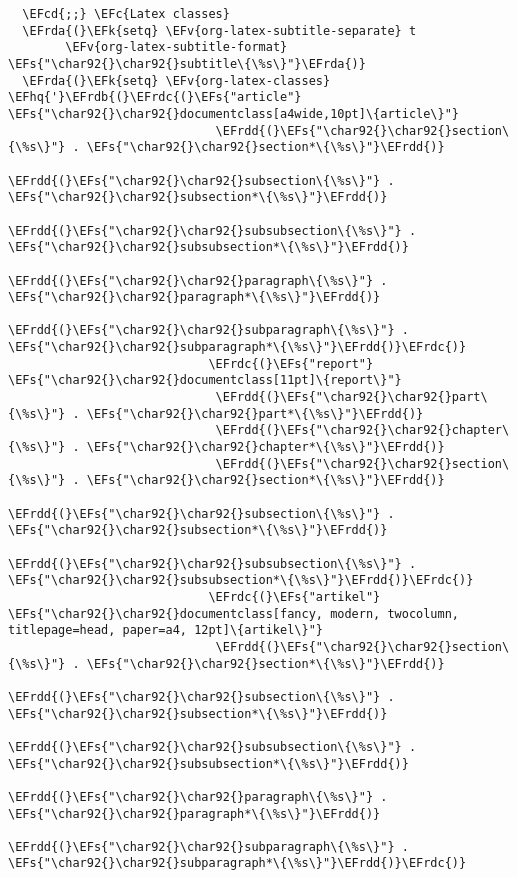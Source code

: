 \documentclass[a4wide,10pt]{article}
\newcommand{\EFc}[1]{\textcolor{EFc}{#1}} %
\newcommand{\EFcd}[1]{\textcolor{EFcd}{#1}} %
\newcommand{\EFs}[1]{\textcolor{EFs}{#1}} %
\newcommand{\EFk}[1]{\textcolor{EFk}{#1}} %
\newcommand{\EFv}[1]{\textcolor{EFv}{#1}} %
\newcommand{\EFhq}[1]{\textcolor{EFhq}{#1}} %
\newcommand{\EFrda}[1]{\textcolor{EFrda}{#1}} %
\newcommand{\EFrdb}[1]{\textcolor{EFrdb}{#1}} %
\newcommand{\EFrdc}[1]{\textcolor{EFrdc}{#1}} %
\newcommand{\EFrdd}[1]{\textcolor{EFrdd}{#1}} %
\begin{document}
\begin{Code}
\begin{Verbatim}
  \EFcd{;;} \EFc{Latex classes}
  \EFrda{(}\EFk{setq} \EFv{org-latex-subtitle-separate} t
        \EFv{org-latex-subtitle-format} \EFs{"\char92{}\char92{}subtitle\{\%s\}"}\EFrda{)}
  \EFrda{(}\EFk{setq} \EFv{org-latex-classes} \EFhq{'}\EFrdb{(}\EFrdc{(}\EFs{"article"} \EFs{"\char92{}\char92{}documentclass[a4wide,10pt]\{article\}"}
                             \EFrdd{(}\EFs{"\char92{}\char92{}section\{\%s\}"} . \EFs{"\char92{}\char92{}section*\{\%s\}"}\EFrdd{)}
                             \EFrdd{(}\EFs{"\char92{}\char92{}subsection\{\%s\}"} . \EFs{"\char92{}\char92{}subsection*\{\%s\}"}\EFrdd{)}
                             \EFrdd{(}\EFs{"\char92{}\char92{}subsubsection\{\%s\}"} . \EFs{"\char92{}\char92{}subsubsection*\{\%s\}"}\EFrdd{)}
                             \EFrdd{(}\EFs{"\char92{}\char92{}paragraph\{\%s\}"} . \EFs{"\char92{}\char92{}paragraph*\{\%s\}"}\EFrdd{)}
                             \EFrdd{(}\EFs{"\char92{}\char92{}subparagraph\{\%s\}"} . \EFs{"\char92{}\char92{}subparagraph*\{\%s\}"}\EFrdd{)}\EFrdc{)}
                            \EFrdc{(}\EFs{"report"} \EFs{"\char92{}\char92{}documentclass[11pt]\{report\}"}
                             \EFrdd{(}\EFs{"\char92{}\char92{}part\{\%s\}"} . \EFs{"\char92{}\char92{}part*\{\%s\}"}\EFrdd{)}
                             \EFrdd{(}\EFs{"\char92{}\char92{}chapter\{\%s\}"} . \EFs{"\char92{}\char92{}chapter*\{\%s\}"}\EFrdd{)}
                             \EFrdd{(}\EFs{"\char92{}\char92{}section\{\%s\}"} . \EFs{"\char92{}\char92{}section*\{\%s\}"}\EFrdd{)}
                             \EFrdd{(}\EFs{"\char92{}\char92{}subsection\{\%s\}"} . \EFs{"\char92{}\char92{}subsection*\{\%s\}"}\EFrdd{)}
                             \EFrdd{(}\EFs{"\char92{}\char92{}subsubsection\{\%s\}"} . \EFs{"\char92{}\char92{}subsubsection*\{\%s\}"}\EFrdd{)}\EFrdc{)}
                            \EFrdc{(}\EFs{"artikel"} \EFs{"\char92{}\char92{}documentclass[fancy, modern, twocolumn, titlepage=head, paper=a4, 12pt]\{artikel\}"}
                             \EFrdd{(}\EFs{"\char92{}\char92{}section\{\%s\}"} . \EFs{"\char92{}\char92{}section*\{\%s\}"}\EFrdd{)}
                             \EFrdd{(}\EFs{"\char92{}\char92{}subsection\{\%s\}"} . \EFs{"\char92{}\char92{}subsection*\{\%s\}"}\EFrdd{)}
                             \EFrdd{(}\EFs{"\char92{}\char92{}subsubsection\{\%s\}"} . \EFs{"\char92{}\char92{}subsubsection*\{\%s\}"}\EFrdd{)}
                             \EFrdd{(}\EFs{"\char92{}\char92{}paragraph\{\%s\}"} . \EFs{"\char92{}\char92{}paragraph*\{\%s\}"}\EFrdd{)}
                             \EFrdd{(}\EFs{"\char92{}\char92{}subparagraph\{\%s\}"} . \EFs{"\char92{}\char92{}subparagraph*\{\%s\}"}\EFrdd{)}\EFrdc{)}

\end{Verbatim}
\end{Code}
\end{document}

